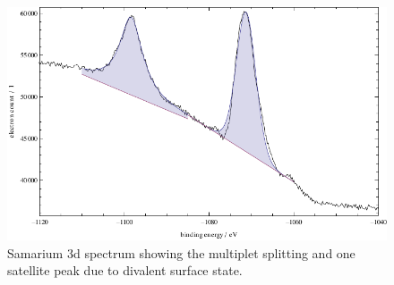 \documentclass[a4paper]{scrartcl}
\numberwithin{equation}{section}
\numberwithin{figure}{section}
\numberwithin{table}{section}
\begin{document}
\begin{figure}
  \centering
   	\includegraphics[width=\linewidth]{img/3d.pdf}
 \caption{\small Samarium 3d spectrum showing the multiplet splitting and one satellite peak due to divalent surface state. }
        \label{3d}
\end{figure}
\end{document}
